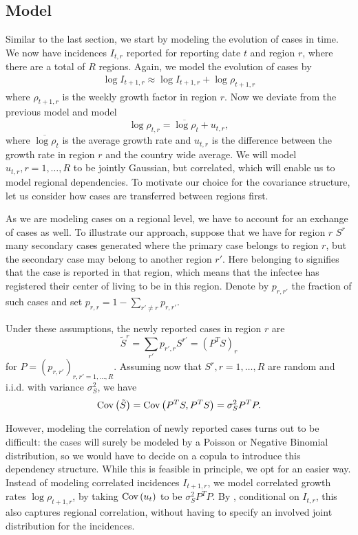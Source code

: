 \subsection{Model}
Similar to the last section, we start by modeling the evolution of cases in time. We now have incidences $I_{t,r}$ reported for reporting date $t$ and region $r$, where there are a total of $R$ regions. 
Again, we model the evolution of cases by 
\begin{align}
    \label{eq:log-growth-regional-model}
    \log I_{t + 1, r} \approx \log I_{t + 1, r} + \log \rho_{t + 1, r}
\end{align}
where $\rho_{t+1, r}$ is the weekly growth factor in region $r$. Now we deviate from the previous model and model 
$$
    \log \rho_{t, r} = \overline{\log \rho}_{t} + u_{t, r},
$$
where $\overline{\log\rho}_{t}$ is the average growth rate and $u_{t,r}$ is the difference between the growth rate in region $r$ and the country wide average. 
We will model $u_{t,r}, r = 1, \dots, R$ to be jointly Gaussian, but correlated, which will enable us to model regional dependencies. To motivate our choice for the covariance structure, let us consider how cases are transferred between regions first.

As we are modeling cases on a regional level, we have to account for an exchange of cases as well. To illustrate our approach, suppose that we have for region $r$ $S^{r}$ many secondary cases generated where the primary case belongs to region $r$, but the secondary case may belong to another region $r'$. Here \glqq{}belonging to\grqq{} signifies that the case is reported in that region, which means that the infectee has registered their center of living to be in this region. Denote by $p_{r,r'}$ the fraction of such cases and set $p_{r,r} = 1 - \sum_{r' \neq r} p_{r,r'}$. 

Under these assumptions, the newly reported cases in region $r$ are 
$$
    \tilde S^{r} = \sum_{r'} p_{r',r} S^{r'} = (P^{T}S)_{r}
$$
for $ P = \left( p_{r, r'} \right)_{r,r' = 1, \dots, R}$. Assuming now that $S^{r}, r= 1, \dots, R$ are random and i.i.d. with variance $\sigma^{2}_S$, we have 
$$
    \operatorname{Cov} \left( \tilde S\right) = \operatorname{Cov} \left( P^{T}S, P^{T}S \right) = \sigma^{2}_SP^{T}P.
$$

However, modeling the correlation of newly reported cases turns out to be difficult: the cases will surely be modeled by a Poisson or Negative Binomial distribution, so we would have to decide on a copula to introduce this dependency structure. While this is feasible in principle, we opt for an easier way. Instead of modeling correlated incidences $I_{t + 1, r}$, we model correlated growth rates $\log \rho_{t + 1, r}$, by taking $\operatorname{Cov} \left( u_{t} \right)$ to be $\sigma^{2}_SP^{T}P$. By , conditional on $I_{t,r}$, this also captures regional correlation, without having to specify an involved joint distribution for the incidences.

